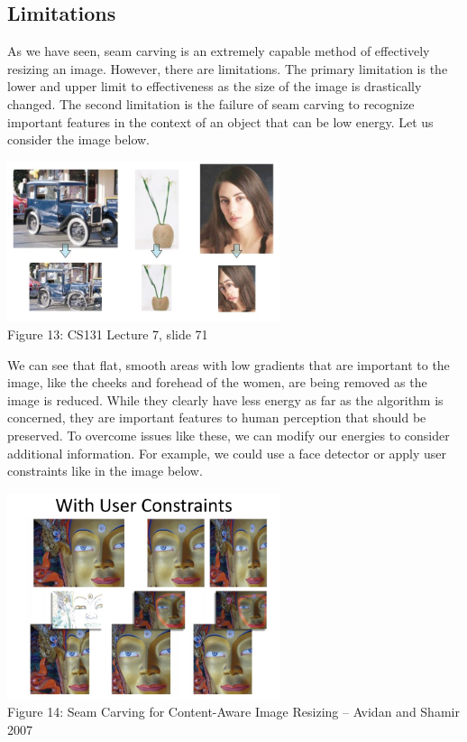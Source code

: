 \documentclass{article}
\begin{document}
\subsection{Limitations}
As we have seen, seam carving is an extremely capable method of effectively resizing an image. However, there are limitations. The primary limitation is the lower and upper limit to effectiveness as the size of the image is drastically changed.  The second limitation is the failure of seam carving to recognize important features in the context of an object that can be low energy. Let us consider the image below.
\begin{center}
\includegraphics[width=8cm]{seam_carving_limitations.JPG} \\
Figure 13: CS131 Lecture 7, slide 71
\end{center}

We can see that flat, smooth areas with low gradients that are important to the image, like the cheeks and forehead of the women, are being removed as the image is reduced. While they clearly have less energy as far as the algorithm is concerned, they are important features to human perception that should be preserved. To overcome issues like these, we can modify our energies to consider additional information. For example, we could use a face detector or apply user constraints like in the image below. 

\begin{center}
\includegraphics[width=8cm]{user_constraints.PNG} \\
Figure 14: Seam Carving	for	Content-Aware Image	Resizing – Avidan and Shamir	2007
\end{center}
%
\end{document}
